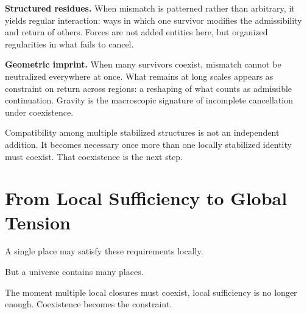 \documentclass[11pt,twoside,openright]{book}
\begin{document}
\medskip

\textbf{Structured residues.}
When mismatch is patterned rather than arbitrary,
it yields regular interaction:
ways in which one survivor modifies
the admissibility and return of others.
Forces are not added entities here,
but organized regularities in what fails to cancel.

\medskip

\textbf{Geometric imprint.}
When many survivors coexist,
mismatch cannot be neutralized everywhere at once.
What remains at long scales appears as constraint on return across regions:
a reshaping of what counts as admissible continuation.
Gravity is the macroscopic signature
of incomplete cancellation under coexistence.

\medskip

Compatibility among multiple stabilized structures is not an independent addition. It becomes necessary once more than one locally stabilized identity must coexist. That coexistence is the next step.

\section*{From Local Sufficiency to Global Tension}

A single place may satisfy these requirements locally.

But a universe contains many places.

The moment multiple local closures must coexist, local sufficiency is no longer enough. Coexistence becomes the constraint.
\end{document}
